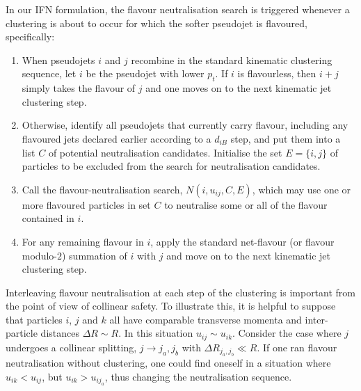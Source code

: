 \documentclass[nofootinbib,twocolumn,preprintnumbers,superscriptaddress,aps]{revtex4-2}
\begin{document}
In our IFN formulation, the flavour
neutralisation search is triggered whenever a clustering is about to
occur for which the softer pseudojet is flavoured, specifically:
\begin{enumerate}[label=I\arabic*.,ref=I\arabic*]
\item \label{alg:main:start}
  When pseudojets $i$ and $j$ recombine in the standard kinematic
  clustering sequence, let $i$ be the pseudojet with lower $p_t$.
  If $i$ is flavourless, then $i+j$ simply takes the flavour of $j$
  and one moves on to the next kinematic jet clustering step.

\item \label{alg:main:get-K}
  Otherwise, identify all pseudojets that currently carry flavour,
  including any flavoured jets declared earlier according to a
  $d_{iB}$ step, and put them into a list $C$ of potential
  neutralisation candidates.
  Initialise the set $E = \{i,j\}$ of particles to be excluded from
  the search for neutralisation candidates.

\item Call the flavour-neutralisation search, $N(i,u_{ij},C,E)$, which
  may use one or more flavoured particles in set $C$ to neutralise
  some or all of the flavour contained in $i$.
  
\item \label{alg:main:final} For any remaining flavour in $i$, apply
  the standard net-flavour (or flavour modulo-$2$) summation of $i$
  with $j$ and move on to the next kinematic jet clustering step.
\end{enumerate}


Interleaving flavour neutralisation at each step of the
clustering is important from the point of view of collinear safety.
%
To illustrate this, it is helpful to suppose
that particles $i$, $j$ and $k$ all have comparable transverse momenta
and inter-particle distances $\Delta R \sim R$.
%
In this situation $u_{ij} \sim u_{ik}$.
%
Consider the case where $j$ undergoes a collinear splitting,
$j \to j_a,j_b$ with $\Delta R_{j_a, j_b} \ll R$.
%
If one ran flavour neutralisation without clustering, one could 
find oneself in a situation where $u_{ik}<u_{ij}$, but
$u_{ik}>u_{ij_a}$, thus changing the neutralisation sequence.
%
\end{document}
